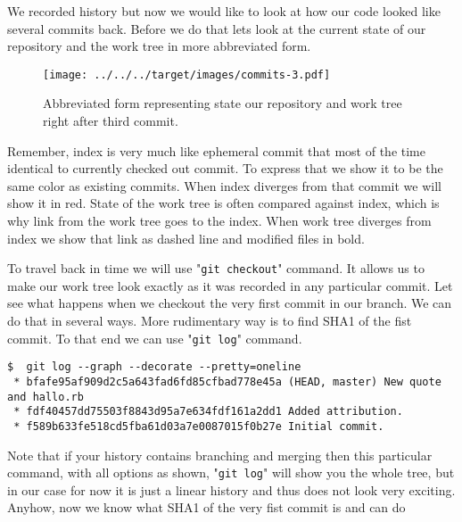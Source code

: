 \documentclass{article}
\theoremstyle{definition}
\begin{document}
        We recorded history but now we would like to look at how our code looked like several commits back.
        Before we do that lets look at the current state of our repository and the work tree in more abbreviated form.

        \begin{figure}[h]
        \texttt{[image: ../../../target/images/commits-3.pdf]}
        \caption{Abbreviated form representing state our repository and work tree right after third commit.\label{fig:commits-3}}
        \end{figure}

        \noindent Remember, index is very much like ephemeral commit that most of the time identical to currently
        checked out commit. To express that we show it to be the same color as existing commits. When index
        diverges from that commit we will show it in red. State of the work tree is often compared against index, which is
        why link from the work tree goes to the  index. When work tree diverges from index we show that link as dashed
        line and modified files in bold.

        To travel back in time we will use "\texttt{git checkout}" command. It allows us to make our work tree look
        exactly as it was recorded in any particular commit. Let see what happens when we checkout the very first
        commit in our branch. We can do that in several ways. More rudimentary way is to find SHA1 of the fist
        commit. To that end we can use "\texttt{git log}" command.

        \begin{Verbatim}[frame=single]
 $  git log --graph --decorate --pretty=oneline
 * bfafe95af909d2c5a643fad6fd85cfbad778e45a (HEAD, master) New quote and hallo.rb
 * fdf40457dd75503f8843d95a7e634fdf161a2dd1 Added attribution.
 * f589b633fe518cd5fba61d03a7e0087015f0b27e Initial commit.
        \end{Verbatim}
        Note that if your history contains branching and merging then this particular command, with all options as
        shown, "\texttt{git log}" will show you the whole tree, but in our case for now it is just a linear history
        and thus does not look very exciting. Anyhow, now we know what SHA1 of the very fist commit is and can do
\end{document}
